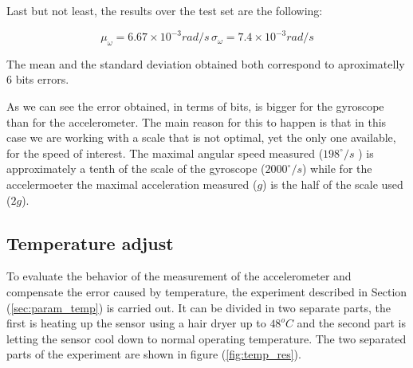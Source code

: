 \documentclass[conference]{IEEEtran}
\newcommand{\refp}[1]{(\ref{#1})}
\begin{document}
Last but not least, the results over the test set are the following:

\begin{equation}
\mu_\omega = 6.67 \times 10^{-3} rad/s\, \sigma_\omega = 7.4 \times 10^{-3} rad/s
\end{equation}

The mean and the standard deviation obtained both correspond to aproximatelly $6$ bits errors.

As we can see the error obtained, in terms of bits, is bigger for the gyroscope than for the accelerometer. The main reason for this to happen is that in this case we are working with a scale that is not optimal, yet the only one available, for the speed of interest. The maximal angular speed measured ($198 ^{\circ} /s$ ) is approximately a tenth of the scale of the gyroscope ($2000^{\circ} /s$) while for the accelermoeter the maximal acceleration measured ($g$) is the half of the scale used ($2 g$). 

\subsection{Temperature adjust}


To evaluate the behavior of the measurement of the accelerometer and compensate the error caused by temperature, the experiment described in Section \refp{sec:param_temp} is carried out. It can be divided in two separate parts, the first is heating up the sensor using a hair dryer up to $48^oC$ and the second part is letting the sensor cool down to normal operating temperature. The two separated parts of the experiment are shown in figure \refp{fig:temp_res}.
\end{document}
